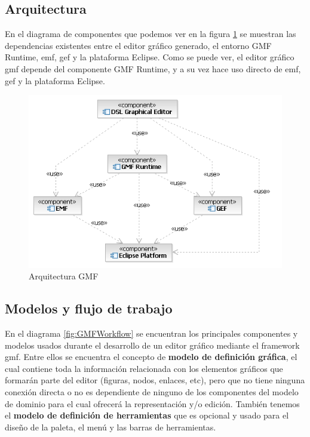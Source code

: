 \documentclass[a4paper,12pt,oneside,spanish]{book}
\begin{document}
\subsection{Arquitectura}

En el diagrama de componentes que podemos ver en la figura \ref{fig:GMFArquitectura} se muestran las dependencias existentes entre el editor gráfico generado, el entorno \textsf{GMF Runtime}, \gls{emf}, \gls{gef} y la plataforma \textsf{Eclipse}. Como se puede ver, el editor gráfico \gls{gmf} depende del componente \textsf{GMF Runtime}, y a su vez hace uso directo de \gls{emf}, \gls{gef} y la plataforma \textsf{Eclipse}.


\begin{figure}[hbtp]
\centering
\includegraphics[scale=.75]{./img/GMFArquitectura}
\caption{Arquitectura GMF}
\label{fig:GMFArquitectura}
\end{figure}


\subsection{Modelos y flujo de trabajo}

En el diagrama \ref{fig:GMFWorkflow} se encuentran los principales componentes y modelos usados durante el desarrollo de un editor gráfico mediante el framework \gls{gmf}. Entre ellos se encuentra el concepto de \textbf{modelo de definición gráfica}, el cual contiene toda la información relacionada con los elementos gráficos que formarán parte del editor (figuras, nodos, enlaces, etc), pero que no tiene ninguna conexión directa o no es dependiente de ninguno de los componentes del modelo de dominio para el cual ofrecerá la representación y/o edición. También tenemos el \textbf{modelo de definición de herramientas} que es opcional y usado para el diseño de la paleta, el menú y las barras de herramientas.
\end{document}

